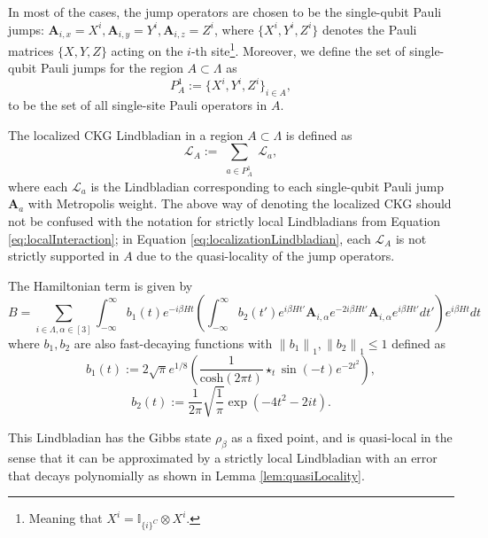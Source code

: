 \documentclass[11pt]{article}
\numberwithin{equation}{section}
\numberwithin{figure}{section}
\numberwithin{table}{section}
\theoremstyle{definition}
\theoremstyle{plain}
\theoremstyle{remark}
\newcommand{\Id}{\mathbb{I}}
\newcommand{\Li}{\mathcal{L}}
\newcommand{\vA}{\bm{A}}
\newcommand{\La}{\Lambda}
\newcommand{\normm}[2]{\left\lVert#1\right\rVert_{#2}}
\newcommand{\summ}[1]{\sum\limits_{\substack{ #1 }}}
\begin{document}
In most of the cases, the jump operators are chosen to be the single-qubit Pauli jumps: $\vA_{i,x}=X^i,\vA_{i,y}=Y^i,\vA_{i,z}=Z^i$, where $\{X^i,Y^i, Z^i\}$ denotes the Pauli matrices $\{X,Y,Z\}$ acting on the $i$-th site\footnote{Meaning that $X^i=\Id_{\{i\}^C}\otimes X^i$.}. Moreover, we define the set of single-qubit Pauli jumps for the region $A\subset \La$ as
\begin{equation}
    P_A^1:=\{X^i,Y^i,Z^i\}_{i\in A},
    \label{eq:pauliJumpsInA}
\end{equation}
to be the set of all single-site Pauli operators in $A$.

The localized CKG Lindbladian in a region $A\subset \La$ is defined as
\begin{equation}
    \Li_A:= \summ{a \in P_A^1}\Li_a,
    \label{eq:localizationLindbladian}
\end{equation}
where each $\Li_a$ is the Lindbladian corresponding to each single-qubit Pauli jump $\vA_a$ with Metropolis weight. The above way of denoting the localized CKG should not be confused with the notation for strictly local Lindbladians from Equation \eqref{eq:localInteraction}; in Equation \eqref{eq:localizationLindbladian}, each $\Li_A$ is not strictly supported in $A$ due to the quasi-locality of the jump operators.

The Hamiltonian term is given by
\begin{equation}
    B=\sum_{i\in\Lambda,\alpha\in[3]}\int_{-\infty}^\infty b_1(t) e^{-i\beta Ht}\left ( \int_{-\infty}^\infty b_2(t')e^{i\beta Ht'}\vA_{i,\alpha}e^{-2i\beta Ht'}\vA_{i,\alpha}e^{i\beta Ht'}dt' \right ) e^{i\beta Ht}dt
\end{equation}
where $b_1,b_2$ are also fast-decaying functions with $\normm{b_1}{1},\normm{b_2}{1}\leq 1$ defined as
\begin{equation}
    b_1(t):= 2\sqrt{\pi}e^{1/8}\left (  \dfrac{1}{\text{cosh}(2\pi t)}\star_t \sin(-t)e^{-2t^2}  \right ),
\end{equation}
\begin{equation}
    b_2(t):=\dfrac{1}{2\pi} \sqrt{\dfrac{1}{\pi}} \exp (-4t^2-2it).
\end{equation}

This Lindbladian has the Gibbs state $\rho_\beta$ as a fixed point, and is quasi-local in the sense that it can be approximated by a strictly local Lindbladian with an error that decays polynomially as shown in Lemma \ref{lem:quasiLocality}.


\end{document}
